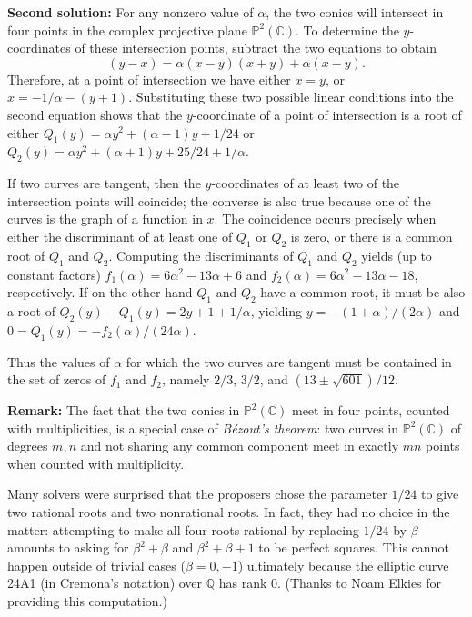 \documentclass[amssymb,twocolumn,pra,10pt,aps]{revtex4-1}
\newcommand{\CC}{\mathbb{C}}
\begin{document}
\begin{itemize}
\textbf{Second solution:}
For any nonzero value of $\alpha$, the two
conics will intersect in four points in the complex projective plane
$\mathbb{P}^2(\mathbb{C})$. To determine the
$y$-coordinates of these intersection points, subtract the two equations
to obtain
\[
(y-x) = \alpha(x-y)(x+y) + \alpha(x-y).
\]
Therefore, at
a point of intersection we have either $x=y$, or $x = -1/\alpha - (y+1)$.
Substituting these two possible linear conditions into the second
equation shows that the $y$-coordinate of a point of intersection is a
root of either
$Q_1(y) = \alpha y^2+(\alpha-1)y + 1/24$ or
$Q_2(y) = \alpha y^2 + (\alpha+1) y + 25/24 +1/\alpha$.

If two curves
are tangent, then the $y$-coordinates of at least two of the
intersection points will coincide; the converse is also true because one of the
curves is the graph of a function in $x$. The coincidence
occurs precisely when either
the discriminant of at least one of $Q_1$ or $Q_2$ is zero, or
there is a common root of $Q_1$ and $Q_2$. Computing the discriminants of $Q_1$
and $Q_2$ yields (up to constant factors) $f_1(\alpha)=6\alpha^2 -
13\alpha + 6$ and $f_2(\alpha)=6\alpha^2 - 13\alpha - 18$, respectively.
If on the other hand $Q_1$ and $Q_2$ have a common root, it must
be also a root of $Q_2(y) - Q_1(y) = 2y +1 + 1/\alpha$,
yielding $y = -(1+\alpha)/(2\alpha)$ and
$0 = Q_1(y) = -f_2(\alpha)/(24 \alpha)$.

Thus the values of
$\alpha$ for which the two curves are tangent must be contained in the
set of zeros of $f_1$ and $f_2$, namely $2/3$, $3/2$, and
$(13\pm\sqrt{601})/12$.

\textbf{Remark:}
The fact that the two conics in $\mathbb{P}^2(\CC)$ meet in four points, counted
with multiplicities, is a special case of \emph{B\'ezout's theorem}: two
curves in $\mathbb{P}^2(\CC)$ of degrees $m, n$ and not sharing any common component
meet in exactly $mn$ points when counted with multiplicity.

Many solvers were surprised that the proposers chose the parameter $1/24$
to give two rational roots and two nonrational roots. In fact, they had
no choice in the matter: attempting to make all four roots rational
by replacing $1/24$ by $\beta$ amounts
to asking for $\beta^2 + \beta$ and $\beta^2 + \beta + 1$ to be perfect
squares. This cannot happen outside of trivial cases ($\beta = 0, -1$)
ultimately because the elliptic curve 24A1 (in Cremona's notation)
over $\mathbb{Q}$ has rank $0$. (Thanks to Noam Elkies for providing this
computation.)


\end{itemize}
\end{document}

